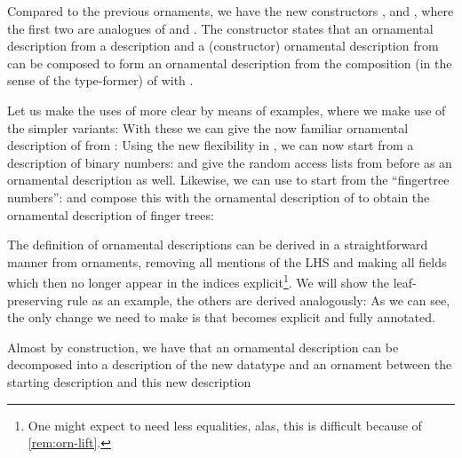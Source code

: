 Compared to the previous ornaments, we have the new constructors ,  and , where the first two are analogues of  and . The  constructor states that an ornamental description from a description  and a (constructor) ornamental description from  can be composed to form an ornamental description from the composition (in the sense of the  type-former) of  with .

Let us make the uses of  more clear by means of examples, where we make use of the simpler variants: 
With these we can give the now familiar ornamental description of  from :
Using the new flexibility in , we can now start from a description of binary numbers:
and give the random access lists from before as an ornamental description as well.
Likewise, we can use  to start from the ``fingertree numbers'':
and compose this with the ornamental description of 
to obtain the ornamental description of finger trees:




\begin{outline}
The definition of ornamental descriptions can be derived in a straightforward manner from ornaments, removing all mentions of the LHS and making all fields which then no longer appear in the indices explicit\footnote{One might expect to need less equalities, alas, this is difficult because of \autoref{rem:orn-lift}.}. We will show the leaf-preserving rule as an example, the others are derived analogously:
As we can see, the only change we need to make is that  becomes explicit and fully annotated.

Almost by construction, we have that an ornamental description can be decomposed into a description of the new datatype
and an ornament between the starting description and this new description
\end{outline}


